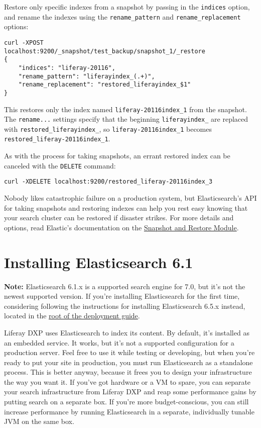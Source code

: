 Restore only specific indexes from a snapshot by passing in the
\texttt{indices} option, and rename the indexes using the
\texttt{rename\_pattern} and \texttt{rename\_replacement} options:

\begin{verbatim}
curl -XPOST
localhost:9200/_snapshot/test_backup/snapshot_1/_restore
{
    "indices": "liferay-20116",
    "rename_pattern": "liferayindex_(.+)",
    "rename_replacement": "restored_liferayindex_$1"
}
\end{verbatim}

This restores only the index named \texttt{liferay-20116index\_1} from
the snapshot. The \texttt{rename...} settings specify that the beginning
\texttt{liferayindex\_} are replaced with
\texttt{restored\_liferayindex\_}, so \texttt{liferay-20116index\_1}
becomes \texttt{restored\_liferay-20116index\_1}.

As with the process for taking snapshots, an errant restored index can
be canceled with the \texttt{DELETE} command:

\begin{verbatim}
curl -XDELETE localhost:9200/restored_liferay-20116index_3
\end{verbatim}

Nobody likes catastrophic failure on a production system, but
Elasticsearch's API for taking snapshots and restoring indexes can help
you rest easy knowing that your search cluster can be restored if
disaster strikes. For more details and options, read Elastic's
documentation on the
\href{https://www.elastic.co/guide/en/elasticsearch/reference/6.5/modules-snapshots.html\#modules-snapshots}{Snapshot
and Restore Module}.

\chapter{Installing Elasticsearch
6.1}\label{installing-elasticsearch-6.1}

\noindent\hrulefill

\textbf{Note:} Elasticsearch 6.1.x is a supported search engine for 7.0,
but it's not the newest supported version. If you're installing
Elasticsearch for the first time, considering following the instructions
for installing Elasticsearch 6.5.x instead, located in the
\href{/docs/7-1/deploy/-/knowledge_base/d/installing-elasticsearch}{root
of the deployment guide}.

\noindent\hrulefill

Liferay DXP uses Elasticsearch to index its content. By default, it's
installed as an embedded service. It works, but it's not a supported
configuration for a production server. Feel free to use it while testing
or developing, but when you're ready to put your site in production, you
must run Elasticsearch as a standalone process. This is better anyway,
because it frees you to design your infrastructure the way you want it.
If you've got hardware or a VM to spare, you can separate your search
infrastructure from Liferay DXP and reap some performance gains by
putting search on a separate box. If you're more budget-conscious, you
can still increase performance by running Elasticsearch in a separate,
individually tunable JVM on the same box.

